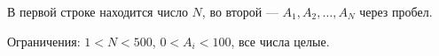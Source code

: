 В первой строке находится число $N$, во второй ---
$A_1, A_2, \ldots, A_N$ через пробел.

Ограничения: $1 < N < 500$, $0 < A_i < 100$, все числа целые.

